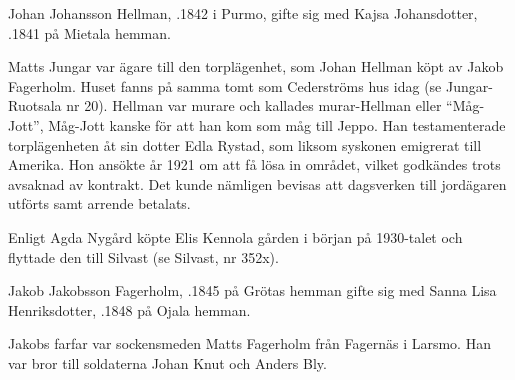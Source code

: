 %
Johan Johansson Hellman, .1842 i Purmo, gifte sig med Kajsa Johansdotter, .1841 på Mietala hemman.
\begin{jhchildren}
  \item {}
  \item {}
  \item {}
  \item {}
\end{jhchildren}
Matts Jungar var ägare till den torplägenhet, som Johan Hellman köpt av Jakob Fagerholm. Huset fanns på samma tomt som Cederströms hus idag (se Jungar-Ruotsala nr 20). Hellman var murare och kallades murar-Hellman eller ``Måg-Jott'', Måg-Jott kanske för att han kom som måg till Jeppo. Han testamenterade torplägenheten åt sin dotter Edla Rystad, som liksom syskonen emigrerat till Amerika. Hon ansökte år 1921 om att få lösa in området, vilket godkändes trots avsaknad av kontrakt. Det kunde nämligen bevisas att dagsverken till jordägaren utförts samt arrende betalats.

Enligt Agda Nygård köpte Elis Kennola gården i början på 1930-talet och flyttade den till Silvast (se Silvast, nr 352x).


%
Jakob Jakobsson Fagerholm, .1845 på Grötas hemman gifte sig med Sanna Lisa Henriksdotter, .1848 på	Ojala hemman.
\begin{jhchildren}
  \item {}
  \item {}
  \item {}
  \item {}
\end{jhchildren}
Jakobs farfar var sockensmeden Matts Fagerholm från Fagernäs i Larsmo. Han var bror till soldaterna Johan Knut och Anders Bly.

